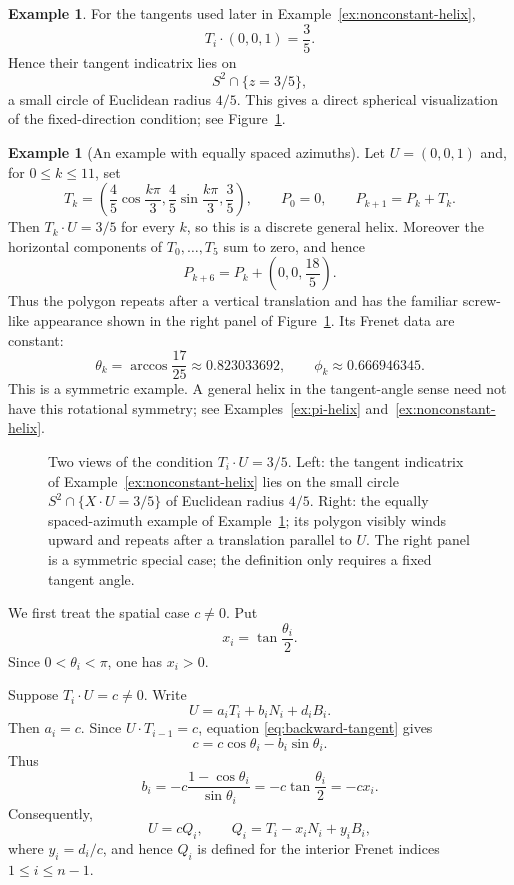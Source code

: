 \documentclass[10pt,a4paper]{amsart}
\theoremstyle{definition}
\newtheorem{example}[theorem]{Example}
\theoremstyle{remark}
\numberwithin{equation}{section}
\begin{document}
\begin{example}\label{ex:indicatrix}
For the tangents used later in Example~\ref{ex:nonconstant-helix},
\[
T_i\cdot(0,0,1)=\frac35.
\]
Hence their tangent indicatrix lies on
\[
S^2\cap\{z=3/5\},
\]
a small circle of Euclidean radius \(4/5\).  This gives a direct
spherical visualization of the fixed-direction condition; see Figure~\ref{fig:tangent-indicatrix}.
\end{example}

\begin{example}[An example with equally spaced azimuths]\label{ex:symmetric-visual-helix}
Let $U=(0,0,1)$ and, for $0\le k\le11$, set
\[
T_k=\left(\frac45\cos\frac{k\pi}{3},\frac45\sin\frac{k\pi}{3},\frac35\right),
\qquad P_0=0,\qquad P_{k+1}=P_k+T_k.
\]
Then $T_k\cdot U=3/5$ for every $k$, so this is a discrete general helix. Moreover the horizontal components of $T_0,\ldots,T_5$ sum to zero, and hence
\[
P_{k+6}=P_k+\left(0,0,\frac{18}{5}\right).
\]
Thus the polygon repeats after a vertical translation and has the familiar screw-like appearance shown in the right panel of Figure~\ref{fig:tangent-indicatrix}. Its Frenet data are constant:
\[
\theta_k=\arccos\frac{17}{25}\approx0.823033692,
\qquad
\phi_k\approx0.666946345.
\]
This is a symmetric example. A general helix in the tangent-angle sense need not have this rotational symmetry; see Examples~\ref{ex:pi-helix} and~\ref{ex:nonconstant-helix}.
\end{example}

\begin{figure}[!ht]
\centering
\resizebox{0.97\textwidth}{!}{}
\caption{Two views of the condition $T_i\cdot U=3/5$. Left: the tangent indicatrix of Example~\ref{ex:nonconstant-helix} lies on the small circle $S^2\cap\{X\cdot U=3/5\}$ of Euclidean radius $4/5$. Right: the equally spaced-azimuth example of Example~\ref{ex:symmetric-visual-helix}; its polygon visibly winds upward and repeats after a translation parallel to $U$. The right panel is a symmetric special case; the definition only requires a fixed tangent angle.}
\label{fig:tangent-indicatrix}
\end{figure}



We first treat the spatial case \(c\neq0\). Put
\begin{equation}
x_i=\tan\frac{\theta_i}{2}.
\label{eq:x-def}
\end{equation}
Since \(0<\theta_i<\pi\), one has \(x_i>0\).

Suppose \(T_i\cdot U=c\neq0\). Write
\[
U=a_iT_i+b_iN_i+d_iB_i.
\]
Then \(a_i=c\).  Since \(U\cdot T_{i-1}=c\), equation
\eqref{eq:backward-tangent} gives
\[
c=c\cos\theta_i-b_i\sin\theta_i.
\]
Thus
\[
b_i=-c\frac{1-\cos\theta_i}{\sin\theta_i}
=-c\tan\frac{\theta_i}{2}=-cx_i.
\]
Consequently,
\begin{equation}
U=cQ_i,\qquad
Q_i=T_i-x_iN_i+y_iB_i,
\label{eq:Qi}
\end{equation}
where \(y_i=d_i/c\), and hence $Q_i$ is defined for the interior Frenet indices $1\le i\le n-1$.
\end{document}
